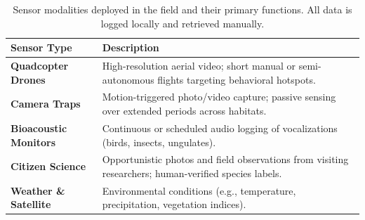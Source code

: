 \begin{table}[t]
\centering
\small
\begin{tabular}{@{}p{3cm}p{13cm}@{}}
\toprule
\textbf{Sensor Type} & \textbf{Description} \\
\midrule
\textbf{Quadcopter Drones} & High-resolution aerial video; short manual or semi-autonomous flights targeting behavioral hotspots. \\
\addlinespace[0.2em]
\textbf{Camera Traps} & Motion-triggered photo/video capture; passive sensing over extended periods across habitats. \\
\addlinespace[0.2em]
\textbf{Bioacoustic Monitors} & Continuous or scheduled audio logging of vocalizations (birds, insects, ungulates). \\
\addlinespace[0.2em]
\textbf{Citizen Science} & Opportunistic photos and field observations from visiting researchers; human-verified species labels. \\
\addlinespace[0.2em]
\textbf{Weather \& Satellite} & Environmental conditions (e.g., temperature, precipitation, vegetation indices). \\
\bottomrule
\end{tabular}
\caption{Sensor modalities deployed in the field and their primary functions. All data is logged locally and retrieved manually.}
\label{tab:modalities}
\end{table}
